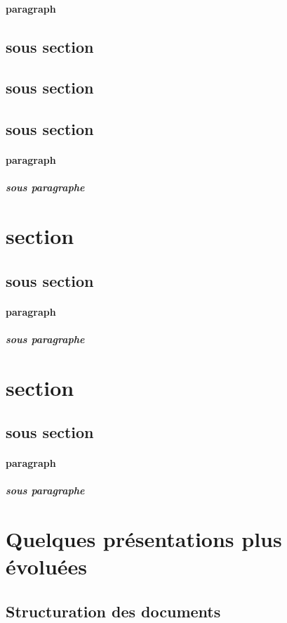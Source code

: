 \documentclass{article}
\begin{document}
\paragraph{paragraph}
\subsection{sous section}
\subsection{sous section}
\subsection{sous section}
\paragraph{paragraph}
\subparagraph{sous paragraphe}

\section{section}
\subsection{sous section}
\paragraph{paragraph}
\subparagraph{sous paragraphe}

\section{section}
\subsection{sous section}
\paragraph{paragraph}
\subparagraph{sous paragraphe}

\section{Quelques présentations plus évoluées}
\subsection{Structuration des documents}
\end{document}
